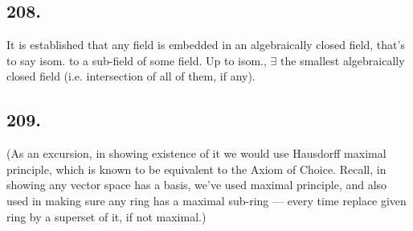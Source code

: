 \documentclass[12pt]{article}
\newcommand\Ex\exists%
\begin{document}
\subsection*{208.} It is established that any field is embedded in an algebraically closed field, that's to say isom. to a sub-field of some field. 
Up to isom., \(\Ex\) the smallest algebraically closed field (i.e. intersection of all of them, if any).

\subsection*{209.} (As an excursion, in showing existence of it we would use Hausdorff maximal principle, which is known to be equivalent to the Axiom of Choice. 
Recall, in showing any vector space has a basis, we've used maximal principle, and also used in making sure any ring has a maximal sub-ring --- every time replace given ring by a superset of it, if not maximal.)
\end{document}
